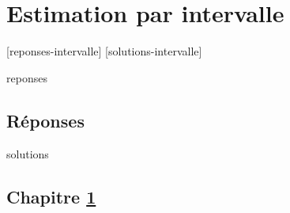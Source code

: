 \documentclass[letterpaper,11pt]{memoir}\usepackage[]{graphicx}\usepackage[]{color}
\newcounter{exercice}[chapter]
\begin{document}


%







\chapter{Estimation par intervalle}
\label{chap:intervalle}

[reponses-intervalle]
[solutions-intervalle]

\begin{Filesave}{reponses}
\bigskip
\section*{Réponses}

\end{Filesave}

\begin{Filesave}{solutions}
\section*{Chapitre \ref{chap:intervalle}}

\end{Filesave}

\end{document}
